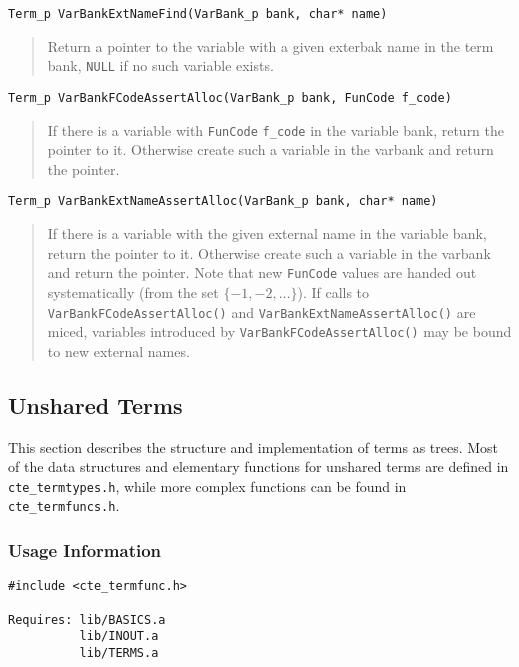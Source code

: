 \begin{verbatim}
Term_p VarBankExtNameFind(VarBank_p bank, char* name)
\end{verbatim}
\begin{quote}
  Return a pointer to the variable with a given exterbak name in the
  term bank, \texttt{NULL} if no such variable exists.
\end{quote}

\begin{verbatim}
Term_p VarBankFCodeAssertAlloc(VarBank_p bank, FunCode f_code)
\end{verbatim}
\begin{quote}
  If there is a variable with \texttt{FunCode} \texttt{f\_code} in the
  variable bank, return the pointer to it. Otherwise create such a
  variable in the varbank and return the pointer.
\end{quote}

\begin{verbatim}
Term_p VarBankExtNameAssertAlloc(VarBank_p bank, char* name)
\end{verbatim}
\begin{quote}
  If there is a variable with the given external name in the variable
  bank, return the pointer to it. Otherwise create such a variable in
  the varbank and return the pointer. Note that new \texttt{FunCode}
  values are handed out systematically (from the set $\{-1,
  -2,\ldots\}$). If calls to \texttt{VarBankFCodeAssertAlloc()} and
  \texttt{VarBankExtNameAssertAlloc()} are miced, variables introduced
  by \texttt{VarBankFCodeAssertAlloc()} may be bound to new external
  names.
\end{quote}




\subsection{Unshared Terms}
\label{sec:terms:unshared}

This section describes the structure and implementation of terms as
trees. Most of the data structures and elementary functions for
unshared terms are defined in \texttt{cte\_termtypes.h}, while more
complex functions can be found in  \texttt{cte\_termfuncs.h}.

\subsubsection{Usage Information}

\begin{verbatim}
#include <cte_termfunc.h>

Requires: lib/BASICS.a
          lib/INOUT.a
          lib/TERMS.a
\end{verbatim}


